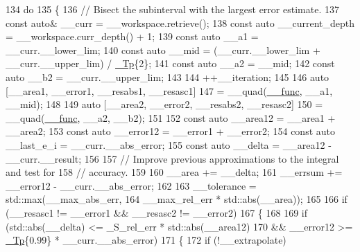 \begin{DoxyCode}
134       \textcolor{keywordflow}{do}
135         \{
136           \textcolor{comment}{// Bisect the subinterval with the largest error estimate.}
137           \textcolor{keyword}{const} \textcolor{keyword}{auto}& \_\_curr = \_\_workspace.retrieve();
138           \textcolor{keyword}{const} \textcolor{keyword}{auto} \_\_current\_depth = \_\_workspace.curr\_depth() + 1;
139           \textcolor{keyword}{const} \textcolor{keyword}{auto} \_\_a1 = \_\_curr.\_\_lower\_lim;
140           \textcolor{keyword}{const} \textcolor{keyword}{auto} \_\_mid = (\_\_curr.\_\_lower\_lim + \_\_curr.\_\_upper\_lim) / \hyperlink{namespace____gnu__cxx_a3b19a9c800ca194374ef9172290f7d79}{\_Tp}\{2\};
141           \textcolor{keyword}{const} \textcolor{keyword}{auto} \_\_a2 = \_\_mid;
142           \textcolor{keyword}{const} \textcolor{keyword}{auto} \_\_b2 = \_\_curr.\_\_upper\_lim;
143 
144           ++\_\_iteration;
145 
146           \textcolor{keyword}{auto} [\_\_area1, \_\_error1, \_\_resabs1, \_\_resasc1]
147             = \_\_quad(\hyperlink{namespace____gnu__cxx_af2b2f0c7a2ae72b922b1afefae5a65b2}{\_\_func}, \_\_a1, \_\_mid);
148 
149           \textcolor{keyword}{auto} [\_\_area2, \_\_error2, \_\_resabs2, \_\_resasc2]
150             = \_\_quad(\hyperlink{namespace____gnu__cxx_af2b2f0c7a2ae72b922b1afefae5a65b2}{\_\_func}, \_\_a2, \_\_b2);
151 
152           \textcolor{keyword}{const} \textcolor{keyword}{auto} \_\_area12 = \_\_area1 + \_\_area2;
153           \textcolor{keyword}{const} \textcolor{keyword}{auto} \_\_error12 = \_\_error1 + \_\_error2;
154           \textcolor{keyword}{const} \textcolor{keyword}{auto} \_\_last\_e\_i = \_\_curr.\_\_abs\_error;
155           \textcolor{keyword}{const} \textcolor{keyword}{auto} \_\_delta = \_\_area12 - \_\_curr.\_\_result;
156 
157           \textcolor{comment}{// Improve previous approximations to the integral and test for}
158           \textcolor{comment}{// accuracy.}
159 
160           \_\_area += \_\_delta;
161           \_\_errsum += \_\_error12 - \_\_curr.\_\_abs\_error;
162 
163           \_\_tolerance = std::max(\_\_max\_abs\_err,
164                                  \_\_max\_rel\_err * std::abs(\_\_area));
165 
166           \textcolor{keywordflow}{if} (\_\_resasc1 != \_\_error1 && \_\_resasc2 != \_\_error2)
167             \{
168 
169               \textcolor{keywordflow}{if} (std::abs(\_\_delta) <= \_S\_rel\_err * std::abs(\_\_area12)
170                   && \_\_error12 >= \hyperlink{namespace____gnu__cxx_a3b19a9c800ca194374ef9172290f7d79}{\_Tp}\{0.99\} * \_\_curr.\_\_abs\_error)
171                 \{
172                   \textcolor{keywordflow}{if} (!\_\_extrapolate)

\end{DoxyCode}
